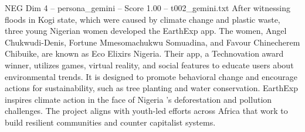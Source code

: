 \begin{textsample}{NEG Dim 4 – persona\_gemini – Score 1.00 – t002\_gemini.txt}  \label{ex:f4_neg_017}
After witnessing floods in Kogi state, which were caused by climate change and plastic waste, three young Nigerian women developed the EarthExp app.
The women, Angel Chukwudi-Denis, Fortune Mmesomachukwu Somuadina, and Favour Chinecherem Chibuike, are known as Eco Elixirs Nigeria.
Their app, a Technovation award winner, utilizes games, virtual reality, and social features to educate users about environmental trends.
It is designed to promote behavioral change and encourage actions for sustainability, such as tree planting and water conservation.
EarthExp inspires climate action in the face of Nigeria 's deforestation and pollution challenges.
The project aligns with youth-led efforts across Africa that work to build resilient communities and counter capitalist systems.

\end{textsample}
